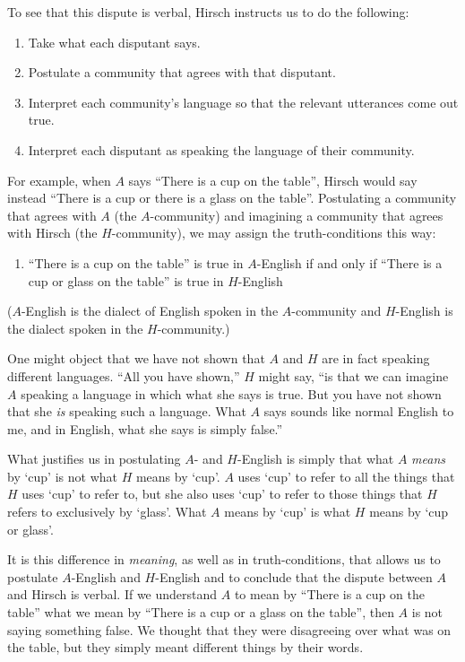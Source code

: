 \documentclass[11pt]{article}
\begin{document}
\begin{spacing}{1.25}
To see that this dispute is verbal, Hirsch instructs us to do the
following:

\begin{enumerate}
  \item Take what each disputant says.
  \item Postulate a community that agrees with that disputant.
  \item Interpret each community's language so that the relevant
    utterances come out true.
  \item Interpret each disputant as speaking the language of their
    community.
\end{enumerate}

For example, when $A$ says ``There is a cup on the table'', Hirsch
would say instead ``There is a cup or there is a glass on the table''.
Postulating a community that agrees with $A$ (the $A$-community) and
imagining a community that agrees with Hirsch (the $H$-community), we
may assign the truth-conditions this way:
\begin{enumerate}[itemindent=25pt, label=(T)]
    \item ``There is a cup on the table'' is true in $A$-English if
      and only if ``There is a cup or glass on the table'' is true in
      $H$-English
\end{enumerate}
($A$-English is the dialect of English spoken in the $A$-community and
$H$-English is the dialect spoken in the $H$-community.)

One might object that we have not shown that $A$ and $H$ are in fact
speaking different languages.  ``All you have shown,'' $H$ might say,
``is that we can imagine $A$ speaking a language in which what she
says is true.  But you have not shown that she {\em is} speaking such
a language.  What $A$ says sounds like normal English to me, and in
English, what she says is simply false.''

What justifies us in postulating $A$- and $H$-English is simply that
what $A$ {\em means} by `cup' is not what $H$ means by `cup'.  $A$
uses `cup' to refer to all the things that $H$ uses `cup' to refer to,
but she also uses `cup' to refer to those things that $H$ refers to
exclusively by `glass'.  What $A$ means by `cup' is what $H$ means by
`cup or glass'.

It is this difference in {\em meaning}, as well as in
truth-conditions, that allows us to postulate $A$-English and
$H$-English and to conclude that the dispute between $A$ and Hirsch is
verbal. If we understand $A$ to mean by ``There is a cup on the
table'' what we mean by ``There is a cup or a glass on the table'',
then $A$ is not saying something false.  We thought that they were
disagreeing over what was on the table, but they simply meant
different things by their words.


\end{spacing}
\end{document}
